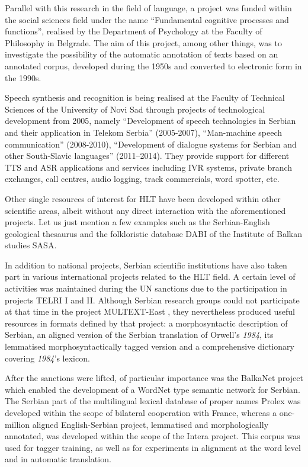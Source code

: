 \begin{multicols}{2}
Parallel with this research in the field of language, a project was funded within the social sciences field under the name “Fundamental cognitive processes and functions”, realised by the Department of Psychology at the Faculty of Philosophy in Belgrade. The aim of this project, among other things, was to investigate the possibility of the automatic annotation of texts based on an annotated corpus, \cite{SRB_KORPUS} developed during the 1950s and converted to electronic form in the 1990s. 

Speech synthesis and recognition is being realised at the Faculty of Technical Sciences of the University of Novi Sad through projects of technological development from 2005, namely “Development of speech technologies in Serbian and their application in Telekom Serbia” (2005-2007), “Man-machine speech communication” (2008-2010), “Development of dialogue systems for Serbian and other South-Slavic languages” (2011--2014). They provide support for different TTS and ASR applications and services including IVR systems, private branch exchanges, call centres, audio logging, track commercials, word spotter, etc.
 
Other single resources of interest for HLT have been developed within other scientific areas, albeit without any direct interaction with the aforementioned projects. Let us just mention a few examples such as the Serbian-English geological thesaurus \cite{RGF} and the folkloristic database DABI of the Institute of Balkan studies SASA. \cite{BALKANINSTITUT} 

In addition to national projects, Serbian scientific institutions have also taken part in various international projects related to the HLT field. A certain level of activities was maintained during the UN sanctions due to the participation in projects TELRI I and II. \cite{TELRI} Although Serbian research groups could not participate at that time in the project MULTEXT-East \cite{NL}, they nevertheless produced useful resources in formats defined by that project: a morphosyntactic description of Serbian, an aligned version of the Serbian translation of Orwell’s \textit{1984}, its lemmatised morphosyntactically tagged version and a comprehensive dictionary covering \textit{1984}'s lexicon. 

After the sanctions were lifted, of particular importance was the BalkaNet \cite{CORDIS} project which enabled the development of a WordNet type semantic network for Serbian. The Serbian part of the multilingual lexical database of proper names Prolex \cite{CNRTL} was developed within the scope of bilateral cooperation with France, whereas a one-million aligned English-Serbian project, lemmatised and morphologically annotated, was developed within the scope of the Intera project.  This corpus was used for tagger training, as well as for experiments in alignment at the word level and in automatic translation.
 

\end{multicols}

